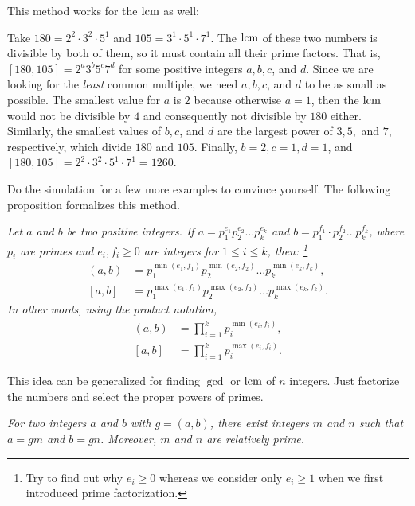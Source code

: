 \documentclass{subfile}
\begin{document}
	This method works for the $\operatorname{lcm}$ as well:
	\begin{example}
		Take $180=2^2\cdot3^2\cdot5^1$ and $105=3^1\cdot5^1\cdot7^1$. The $\operatorname{lcm}$ of these two numbers is divisible by both of them, so it must contain all their prime factors. That is, $[180, 105]=2^a3^b5^c7^d$ for some positive integers $a,b,c$, and $d$. Since we are looking for the \textit{least} common multiple, we need $a,b,c$, and $d$ to be as small as possible. The smallest value for $a$ is $2$ because otherwise $a=1$, then the $\operatorname{lcm}$ would not be divisible by $4$ and consequently not divisible by $180$ either. Similarly, the smallest values of $b,c$, and $d$ are the largest power of $3, 5,$ and $7$, respectively, which divide $180$ and $105$. Finally, $b=2, c=1, d=1$, and $[180, 105] = 2^2\cdot3^2\cdot5^1 \cdot 7^1 = 1260$.
	\end{example}
	Do the simulation for a few more examples to convince yourself. The following proposition formalizes this method.

	\begin{proposition}\slshape\label{prop:gcdfactorization}
		Let $a$ and $b$ be two positive integers. If $a=p_1^{e_1}p_2^{e_2}\dots p_k^{e_k}$ and $b=p_1^{f_1}\cdot p_2^{f_2}\dots p_k^{f_k}$, where $p_i$ are primes and $e_i,f_i\geq0$ are integers for $1\leq i\leq k$, then: \footnote{Try to find out why $e_i\geq0$ whereas we consider only $e_i\geq1$ when we first introduced prime factorization.}
		\begin{align*}
			(a,b) & =p_1^{\min(e_1,f_1)}p_2^{\min(e_2,f_2)}\dots p_k^{\min(e_k,f_k)}, \\
			[a,b] &= p_1^{\max(e_1,f_1)}p_2^{ \max (e_2,f_2)}\dots p_k^{\max(e_k,f_k)}.
		\end{align*}
		In other words, using  the product notation,
		\begin{align*}
			(a,b) & =\prod_{i=1}^kp_i^{\min(e_i,f_i)},\\
			[a,b] & =\prod_{i=1}^kp_i^{\max(e_i,f_i)}.
		\end{align*}
	\end{proposition}

	\begin{note}
		This idea can be generalized for finding $\gcd$ or $\operatorname{lcm}$ of $n$ integers. Just factorize the numbers and select the proper powers of primes.
	\end{note}
	\begin{proposition}\slshape\label{prop:gcduncommon}
		For two integers $a$ and $b$ with $g=(a,b)$, there exist integers $m$ and $n$ such that $a=gm$ and $b=gn$. Moreover, $m$ and $n$ are relatively prime.
	\end{proposition}
\end{document}

